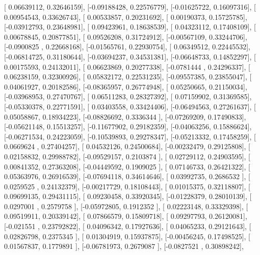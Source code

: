 \documentclass{article}
\begin{document}
       [ 0.06639112,  0.32646159],
       [-0.09188428,  0.22576779],
       [-0.01625722,  0.16097316],
       [ 0.00954543,  0.33626743],
       [ 0.00533857,  0.20231692],
       [ 0.00190373,  0.15725785],
       [-0.03912793,  0.23648981],
       [ 0.09423961,  0.18638539],
       [ 0.04323112,  0.17408109],
       [ 0.00678845,  0.20877851],
       [ 0.09526208,  0.31724912],
       [-0.00567109,  0.33244706],
       [-0.0900825 ,  0.22668168],
       [-0.01565761,  0.22930754],
       [ 0.06349512,  0.22445532],
       [-0.06814725,  0.31180644],
       [-0.03694237,  0.34531381],
       [-0.06648733,  0.14852297],
       [ 0.00175593,  0.24132011],
       [ 0.06623869,  0.20277338],
       [-0.0781444 ,  0.24296337],
       [ 0.06238159,  0.32300926],
       [ 0.05832172,  0.22531235],
       [-0.09557385,  0.23855047],
       [ 0.04061927,  0.20182586],
       [-0.08365957,  0.26774948],
       [ 0.05250665,  0.21150034],
       [-0.03968953,  0.27470767],
       [ 0.06511283,  0.28327392],
       [ 0.07159902,  0.31369585],
       [-0.05330378,  0.22771591],
       [ 0.03403558,  0.33424406],
       [-0.06494563,  0.27261637],
       [ 0.05058867,  0.18934223],
       [-0.08826692,  0.3336344 ],
       [-0.07269209,  0.17490833],
       [-0.05621148,  0.15513257],
       [-0.11677902,  0.29182359],
       [-0.04063256,  0.15886624],
       [-0.06271534,  0.24223059],
       [-0.10539893,  0.29278347],
       [-0.05213332,  0.17458259],
       [ 0.0669624 ,  0.27404257],
       [ 0.04532126,  0.24500684],
       [-0.00232479,  0.29125808],
       [ 0.02158832,  0.29988782],
       [-0.09529157,  0.2103874 ],
       [ 0.02729112,  0.24903595],
       [ 0.00841352,  0.27363208],
       [-0.04449592,  0.1909025 ],
       [ 0.07146733,  0.26421322],
       [ 0.05363976,  0.26916539],
       [-0.07694118,  0.34614646],
       [ 0.03992735,  0.2686532 ],
       [ 0.0259525 ,  0.24132379],
       [-0.00217729,  0.18108443],
       [ 0.01015375,  0.32118807],
       [ 0.09699135,  0.29431115],
       [ 0.09230458,  0.33920345],
       [-0.01228379,  0.28010139],
       [ 0.0297001 ,  0.2579758 ],
       [-0.05972805,  0.1912352 ],
       [ 0.02223148,  0.33329398],
       [ 0.09519911,  0.20339142],
       [ 0.07866579,  0.15809718],
       [ 0.09297793,  0.26120081],
       [-0.021551  ,  0.23792822],
       [ 0.04096342,  0.17927636],
       [ 0.04065233,  0.29121643],
       [ 0.02826798,  0.2375345 ],
       [ 0.01304919,  0.15937875],
       [-0.00456245,  0.17498525],
       [ 0.01567837,  0.1779891 ],
       [-0.06781973,  0.2679087 ],
       [-0.0827521 ,  0.30898242],
\end{document}
